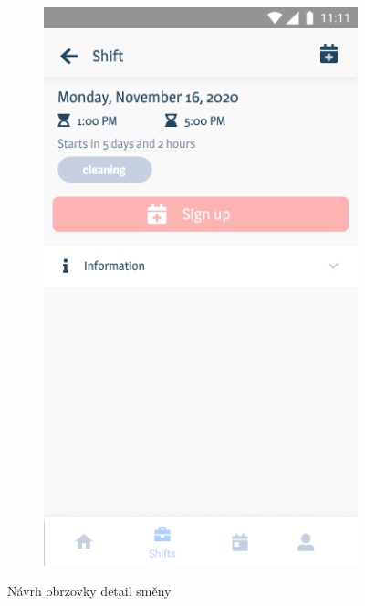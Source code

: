 \documentclass[twoside]{ctuthesis}
\begin{document}
\begin{figure}[h]
\begin{subfigure}[h!]{.5\textwidth}
		\includegraphics[width=.9\linewidth]{img/v1-shift-detail-button.png}
		\label{fig:v1-shift-button}
	\end{subfigure}
	\caption{Návrh obrzovky detail směny}
\end{figure}
\end{document}

